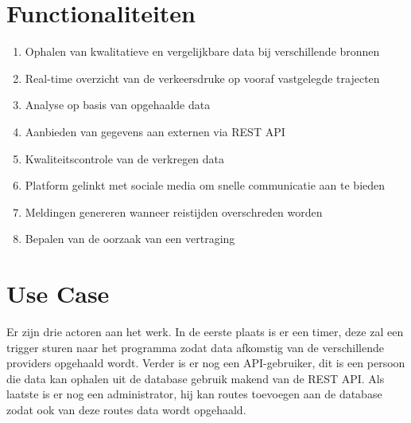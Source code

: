 \documentclass[ps,a4paper,oneside]{report}
\begin{document}
\section{Functionaliteiten}
\begin{enumerate}
\item Ophalen van kwalitatieve en vergelijkbare data bij verschillende bronnen
\item Real-time overzicht van de verkeersdruke op vooraf vastgelegde trajecten
\item Analyse op basis van opgehaalde data
\item Aanbieden van gegevens aan externen via REST API
\item Kwaliteitscontrole van de verkregen data
\item Platform gelinkt met sociale media om snelle communicatie aan te bieden
\item Meldingen genereren wanneer reistijden overschreden worden
\item Bepalen van de oorzaak van een vertraging
\end{enumerate}
\section{Use Case}
Er zijn drie actoren aan het werk. In de eerste plaats is er een timer, deze zal een trigger sturen naar het programma zodat data afkomstig van de verschillende providers opgehaald wordt. Verder is er nog een API-gebruiker, dit is een persoon die data kan ophalen uit de database gebruik makend van de REST API. Als laatste is er nog een administrator, hij kan routes toevoegen aan de database zodat ook van deze routes data wordt opgehaald.
\end{document}
